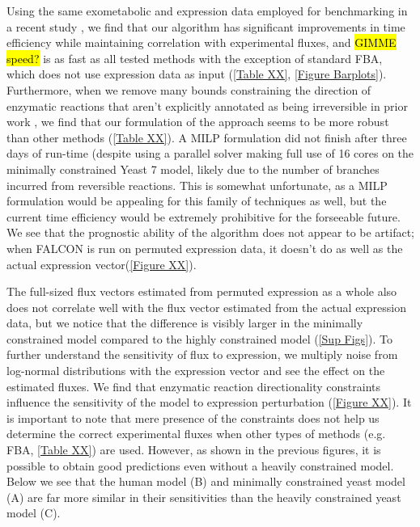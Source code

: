 Using the same exometabolic and expression data employed for
benchmarking in a recent study \citep{Lee2012}, we find that our algorithm has
significant improvements in time efficiency while maintaining
correlation with experimental fluxes, and \hl{GIMME speed?} is as fast as all tested
methods with the exception of standard FBA, which does not use
expression data as input (\ref{Table XX}, \ref{Figure Barplots}). Furthermore, when we remove
many bounds constraining the direction of enzymatic reactions that
aren't explicitly annotated as being irreversible in prior work \citep{Lee2012},
we find that our formulation of the approach seems to be more robust
than other methods (\ref{Table XX}). A MILP formulation did not finish
after three days of run-time (despite using a parallel solver making
full use of 16 cores \citep{gurobi} on the minimally constrained
Yeast 7 model, likely due to the number of branches incurred from
reversible reactions. This is somewhat unfortunate, as a MILP
formulation would be appealing for this family of techniques as well,
but the current time efficiency would be extremely prohibitive for the
forseeable future. We see that the prognostic ability of the algorithm
does not appear to be artifact; when FALCON is run on permuted expression data,
it doesn't do as well as the actual expression vector(\ref{Figure XX}).

The full-sized flux vectors estimated from permuted expression as a
whole also does not correlate well with the flux vector estimated from
the actual expression data, but we notice that the difference is
visibly larger in the minimally constrained model compared to the
highly constrained model (\ref{Sup Figs}). To further understand the
sensitivity of flux to expression, we multiply noise from log-normal
distributions with the expression vector and see the effect on the
estimated fluxes. We find that enzymatic reaction directionality
constraints influence the sensitivity of the model to expression
perturbation (\ref{Figure XX}). It is important to note that mere
presence of the constraints does not help us determine the correct
experimental fluxes when other types of methods (e.g. FBA, \ref{Table
  XX}) are used. However, as shown in the previous figures, it is
possible to obtain good predictions even without a heavily constrained
model. Below we see that the human model (B) and minimally constrained
yeast model (A) are far more similar in their sensitivities than the
heavily constrained yeast model (C).

